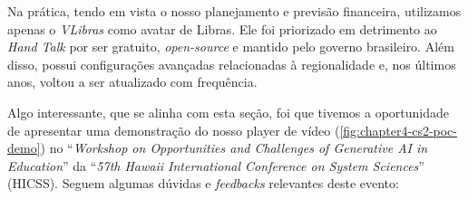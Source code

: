 Na prática, tendo em vista o nosso planejamento e previsão financeira, utilizamos apenas o \textit{VLibras} como avatar de Libras. Ele foi priorizado em detrimento ao \textit{Hand Talk} por ser gratuito, \textit{open-source} e mantido pelo governo brasileiro. Além disso, possui configurações avançadas relacionadas à regionalidade e, nos últimos anos, voltou a ser atualizado com frequência.

Algo interessante, que se alinha com esta seção, foi que tivemos a oportunidade de apresentar uma demonstração do nosso player de vídeo (\autoref{fig:chapter4-cs2-poc-demo}) no ``\textit{Workshop on Opportunities and Challenges of Generative AI in Education}'' da ``\textit{57th Hawaii International Conference on System Sciences}'' (HICSS). Seguem algumas dúvidas e \textit{feedbacks} relevantes deste evento:

